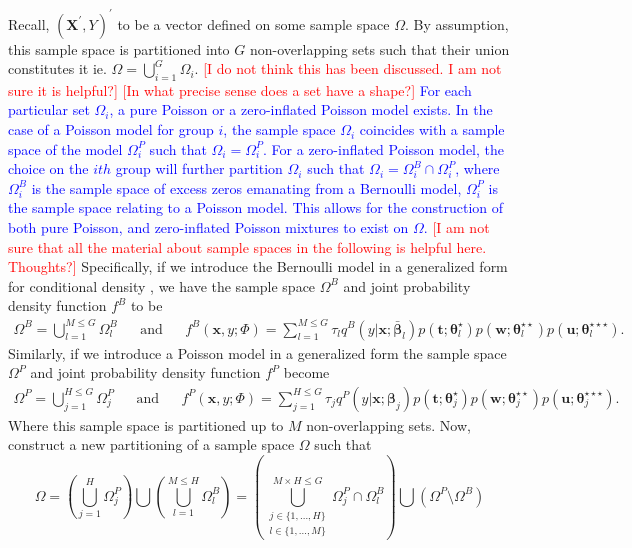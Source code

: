 \documentclass[11pt,letterpaper]{article}
\numberwithin{equation}{section}
\numberwithin{equation}{section}
\numberwithin{equation}{section}
\begin{document}
	Recall, $(\bm {X^{'}}, Y)^{'}$ to be a vector defined on some sample space $\Omega$.   By assumption, this sample space is partitioned into $G$ non-overlapping sets such that their union constitutes it ie. $ \Omega = \bigcup_{i=1}^G \Omega_i $. \textcolor{red}{[I do not think this has been discussed. I am not sure it is helpful?]}  \textcolor{red}{[In what precise sense does a set have a shape?]} 
\textcolor{blue}{
For each particular set $\Omega_i$, a pure Poisson or a zero-inflated Poisson model exists. In the case of a Poisson model for group $i$, the sample space $\Omega_i$ coincides with a sample space of the model $\Omega^P_i$ such that  $\Omega_i = \Omega^P_i$. 
For a zero-inflated Poisson model, the choice on the $ith$ group will further partition $\Omega_i$ such that $\Omega_i = \Omega^{B}_i \cap \Omega^{P}_i  $, where $\Omega^{B}_i$ is the sample space of excess zeros emanating from a Bernoulli model, $\Omega^{P}_i$ is the sample space relating to a Poisson model. This allows for the construction of both pure Poisson, and zero-inflated Poisson mixtures to exist on $\Omega$.   }
	 \textcolor{red}{[I am not sure that all the material about sample spaces in the following is helpful here. Thoughts?]} Specifically, if we introduce the Bernoulli model in a generalized form for conditional density \citep[see][for specific cases]{Ingrassia+Punzo+Vittadini+Minotti:2015}, we have the sample space $\Omega^B$ and joint probability density function $f^B$ to be \begin{align*}
\Omega^B =  \bigcup_{l =1}^{M \leq G}  \Omega_l^B & & \text{and} &  &
f^B(\bm x, y; \Phi)= \sum_{l=1}^{M \leq G} \tau_l q^B(y|\bm{x}; \bm{\bar{\beta}}_l) p(\bm{t};\bm{\theta}_l^{\star})p(\bm{w};\bm{\theta}_l^{\star\star})p(\bm{u};\bm{\theta}_l^{\star\star\star}).
\end{align*}
Similarly, if we introduce a Poisson model in a generalized form the sample space $\Omega^P$ and joint probability density function $f^P$ become
\begin{align*}
\Omega^P =  \bigcup_{j =1}^{H \leq G} \Omega_j^P & & \text{and} &  &
f^P(\bm x, y; \Phi)= \sum_{j=1}^{H \leq G} \tau_j q^P(y|\bm{x};\bm{\beta}_{j}) p(\bm{t};\bm{\theta}_j^{\star})p(\bm{w};\bm{\theta}_j^{\star\star})p(\bm{u};\bm{\theta}_j^{\star\star\star}).
\end{align*}
Where this sample space is partitioned up to $M$ non-overlapping sets.
 Now, construct a new partitioning of a sample space $\Omega$ such that
$$\Omega = \left(\bigcup^H_{j=1} \Omega^P_j \right) \bigcup \left( \bigcup^{M \leq H}_{l=1} \Omega^B_l  \right) = \left( \bigcup_{\substack{j \in \{1, \dots , H \} \\ l \in \{1, \dots , M \} }  }^{M \times H \leq G}  \Omega^P_j \cap \Omega^B_l \right) \bigcup \left( \Omega^P  \setminus \Omega^B \right) $$ 
\end{document}
